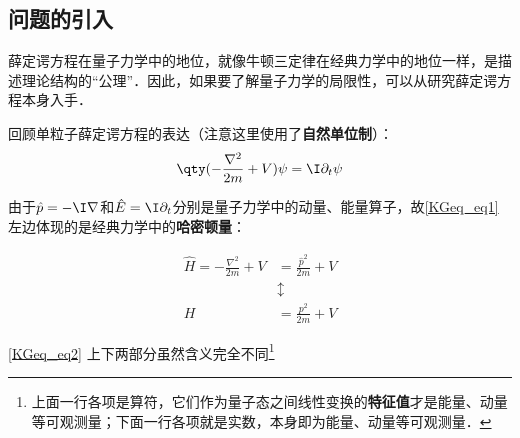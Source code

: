 


\subsection{问题的引入}

薛定谔方程在量子力学中的地位，就像牛顿三定律在经典力学中的地位一样，是描述理论结构的“公理”．因此，如果要了解量子力学的局限性，可以从研究薛定谔方程本身入手．



回顾单粒子薛定谔方程的表达（注意这里使用了\textbf{自然单位制}）：
\begin{equation}\label{KGeq_eq1}
\qty(-\frac{\nabla^2}{2m}+V)\psi = \I \partial_t \psi
\end{equation}

由于$\hat{p}=-\I\nabla$和$\hat{E}=\I\partial_t$分别是量子力学中的动量、能量算子，故\autoref{KGeq_eq1} 左边体现的是经典力学中的\textbf{哈密顿量}：

\begin{equation}\label{KGeq_eq2}
\begin{aligned}
\hat{H}=-\frac{\nabla^2}{2m}+V &= \frac{\hat{p}^2}{2m}+V \\
&\updownarrow\\
H &= \frac{p^2}{2m}+V
\end{aligned}
\end{equation}

\autoref{KGeq_eq2} 上下两部分虽然含义完全不同\footnote{上面一行各项是算符，它们作为量子态之间线性变换的\textbf{特征值}才是能量、动量等可观测量；下面一行各项就是实数，本身即为能量、动量等可观测量．}



















